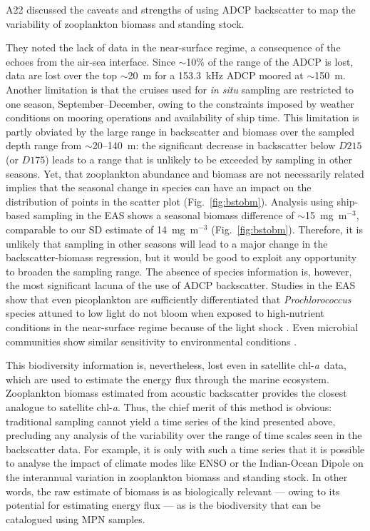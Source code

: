 \documentclass[authoryear,review,11pt]{elsarticle}
\newcommand{\chla}{chl-{\emph{a}}}
\begin{document}
A22 discussed the caveats and strengths of using ADCP backscatter to map the variability of zooplankton biomass and standing stock. 

They noted the lack of data in the near-surface regime, a consequence of the echoes from the air-sea interface. Since $\sim$10\% of the range of the ADCP is lost, data are lost over the top $\sim$20~m for a 153.3~kHz ADCP moored at $\sim$150~m. Another limitation is that the cruises used for \emph{in situ} sampling are restricted to one season, September--December, owing to the constraints imposed by weather conditions on mooring operations and availability of ship time. This limitation is partly obviated by the large range in backscatter and biomass over the sampled depth range from $\sim$20--140~m: the significant decrease in backscatter below $D215$ (or $D175$) leads to a range that is unlikely to be exceeded by sampling in other seasons.  Yet, that zooplankton abundance and biomass are not necessarily related \citep[see, for example,][]{madhupratap1990response, israel2018seasonal} implies that the seasonal change in species can have an impact on the distribution of points in the scatter plot (Fig.~\ref{fig:bstobm}). Analysis using ship-based sampling in the EAS \citep{jadhav2024abundance} shows a seasonal biomass difference of $\sim$15~mg~m$^{-3}$, comparable to our SD estimate of 14~mg~m$^{-3}$ (Fig.~\ref{fig:bstobm}). Therefore, it is unlikely that sampling in other seasons will lead to a major change in the backscatter-biomass regression, but it would be good to exploit any opportunity to broaden the sampling range.  The absence of species information is, however, the most significant lacuna of the use of ADCP backscatter.  Studies in the EAS show that even picoplankton are sufficiently differentiated that \emph{Prochlorococcus} species attuned to low light do not bloom when exposed to high-nutrient conditions in the near-surface regime because of the light shock \citep{bemal2018picophytoplankton}. Even microbial communities show similar sensitivity to environmental conditions \citep{khandeparker2025application}.

This biodiversity information is, nevertheless, lost even in satellite \chla\ data, which are used to estimate the energy flux through the marine ecosystem. Zooplankton biomass estimated from acoustic backscatter provides the closest analogue to satellite \chla.  Thus, the chief merit of this method is obvious: traditional sampling cannot yield a time series of the kind presented above, precluding any analysis of the variability over the range of time scales seen in the backscatter data. For example, it is only with such a time series that it is possible to analyse the impact of climate modes like ENSO \citep[El~Ni{\~n}o Southern Oscillation; see, for example,][]{sikka:1980} or the Indian-Ocean Dipole \citep[IOD;][]{saji/etal:1999} on the interannual variation in zooplankton biomass and standing stock. In other words, the raw estimate of biomass is as biologically relevant --- owing to its potential for estimating energy flux --- as is the biodiversity that can be catalogued using MPN samples.
\end{document}
